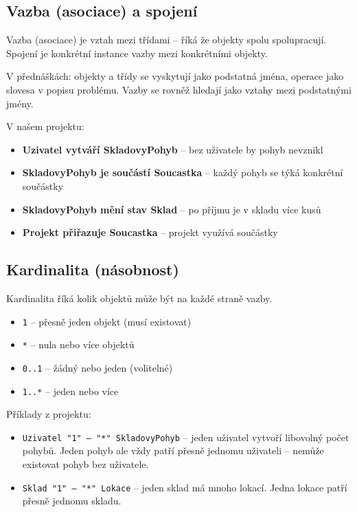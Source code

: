 \documentclass[12pt, a4paper]{article}
\begin{document}
\subsection{Vazba (asociace) a spojení}

Vazba (asociace) je vztah mezi třídami -- říká že objekty spolu spolupracují. Spojení je konkrétní instance vazby mezi konkrétními objekty.

V přednáškách: objekty a třídy se vyskytují jako podstatná jména, operace jako slovesa v popisu problému. Vazby se rovněž hledají jako vztahy mezi podstatnými jmény.

V našem projektu:
\begin{itemize}
  \item \textbf{Uzivatel vytváří SkladovyPohyb} -- bez uživatele by pohyb nevznikl
  \item \textbf{SkladovyPohyb je součástí Soucastka} -- každý pohyb se týká konkrétní součástky
  \item \textbf{SkladovyPohyb mění stav Sklad} -- po příjmu je v skladu více kusů
  \item \textbf{Projekt přiřazuje Soucastka} -- projekt využívá součástky
\end{itemize}

\subsection{Kardinalita (násobnost)}

Kardinalita říká kolik objektů může být na každé straně vazby.

\begin{itemize}
  \item \texttt{1} -- přesně jeden objekt (musí existovat)
  \item \texttt{*} -- nula nebo více objektů
  \item \texttt{0..1} -- žádný nebo jeden (volitelné)
  \item \texttt{1..*} -- jeden nebo více
\end{itemize}

Příklady z projektu:
\begin{itemize}
  \item \texttt{Uzivatel "1" -- "*" SkladovyPohyb} -- jeden uživatel vytvoří libovolný počet pohybů. Jeden pohyb ale vždy patří přesně jednomu uživateli -- nemůže existovat pohyb bez uživatele.
  \item \texttt{Sklad "1" -- "*" Lokace} -- jeden sklad má mnoho lokací. Jedna lokace patří přesně jednomu skladu.
\end{itemize}
\end{document}
